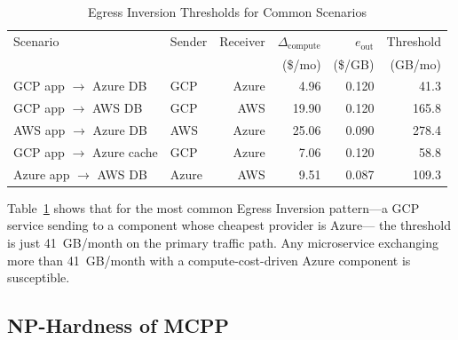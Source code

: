 \documentclass[10pt,journal]{IEEEtran}
\begin{document}
\begin{table}[ht]
\centering
\caption{Egress Inversion Thresholds for Common Scenarios}
\label{tab:inv_thresholds}
\setlength{\tabcolsep}{4pt}
\begin{tabular}{llrrrr}
\toprule
Scenario & Sender & Receiver & $\Delta_\text{compute}$ & $e_\text{out}$ & Threshold\\
& & & (\$/mo) & (\$/GB) & (GB/mo)\\
\midrule
GCP app $\to$ Azure DB & GCP & Azure & 4.96 & 0.120 & 41.3\\
GCP app $\to$ AWS DB & GCP & AWS & 19.90 & 0.120 & 165.8\\
AWS app $\to$ Azure DB & AWS & Azure & 25.06 & 0.090 & 278.4\\
GCP app $\to$ Azure cache & GCP & Azure & 7.06 & 0.120 & 58.8\\
Azure app $\to$ AWS DB & Azure & AWS & 9.51 & 0.087 & 109.3\\
\bottomrule
\end{tabular}
\end{table}

Table~\ref{tab:inv_thresholds} shows that for the most common Egress Inversion
pattern---a GCP service sending to a component whose cheapest provider is Azure---
the threshold is just 41~GB/month on the primary traffic path.
Any microservice exchanging more than 41~GB/month with a compute-cost-driven
Azure component is susceptible.

\subsection{NP-Hardness of MCPP}
\end{document}
